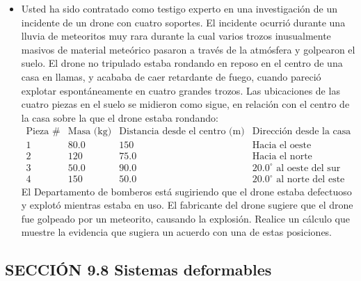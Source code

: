 \documentclass[11pt,a4paper]{article}
\begin{document}
\begin{itemize}
    \item[\textbf{29.}] Usted ha sido contratado como testigo experto en una investigación de un incidente de un drone con cuatro soportes. El incidente ocurrió durante una lluvia de meteoritos muy rara durante la cual varios trozos inusualmente masivos de material meteórico pasaron a través de la atmósfera y golpearon el suelo. El drone no tripulado estaba rondando en reposo en el centro de una casa en llamas, y acababa de caer retardante de fuego, cuando pareció explotar espontáneamente en cuatro grandes trozos. Las ubicaciones de las cuatro piezas en el suelo se midieron como sigue, en relación con el centro de la casa sobre la que el drone estaba rondando:
    \[
    \begin{array}{c|c|c|c}
    \text{Pieza \#} & \text{Masa (kg)} & \text{Distancia desde el centro (m)} & \text{Dirección desde la casa} \\
    \hline
    1 & 80.0 & 150 & \text{Hacia el oeste} \\
    2 & 120  & 75.0 & \text{Hacia el norte} \\
    3 & 50.0 & 90.0 & 20.0^\circ \text{ al oeste del sur} \\
    4 & 150  & 50.0 & 20.0^\circ \text{ al norte del este}
    \end{array}
    \]
    El Departamento de bomberos está sugiriendo que el drone estaba defectuoso y explotó mientras estaba en uso. El fabricante del drone sugiere que el drone fue golpeado por un meteorito, causando la explosión. Realice un cálculo que muestre la evidencia que sugiera un acuerdo con una de estas posiciones.
    \vspace*{7cm}
\end{itemize}

\subsection*{SECCIÓN 9.8 Sistemas deformables}
\end{document}
